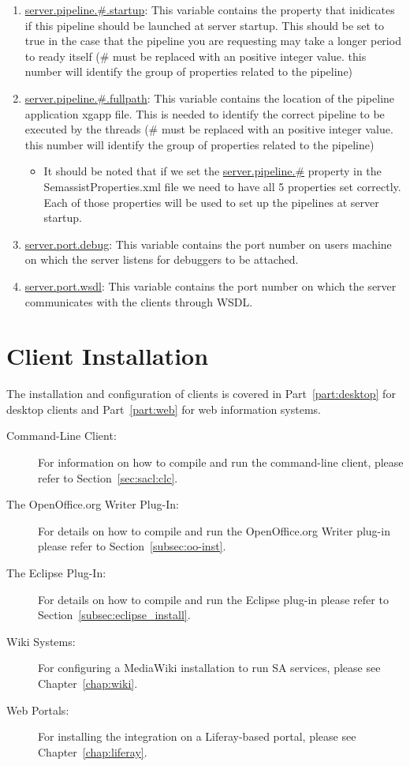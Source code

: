\begin{enumerate}
\item \url{server.pipeline.\#.startup}: This variable contains the property that inidicates if this pipeline should be launched at server startup.  This should be set to true in the case that the pipeline you are requesting may take a longer period to ready itself  (\# must be replaced with an positive integer value.  this number will identify the group of properties related to the pipeline)
\item \url{server.pipeline.\#.fullpath}: This variable contains the location of the pipeline application xgapp file.  This is needed to identify the correct pipeline to be executed by the threads (\# must be replaced with an positive integer value.  this number will identify the group of properties related to the pipeline)
\begin{itemize}
  \item It should be noted that if we set the \url{server.pipeline.\#} property in the SemassistProperties.xml file we need to have all 5 properties set correctly.  Each of those properties will be used to set up the pipelines at server startup.
\end{itemize}
\item \url{server.port.debug}: This variable contains the port number on users machine on which the server listens for debuggers to be attached.
\item \url{server.port.wsdl}: This variable contains the port number on which the server communicates with the clients through WSDL.
\end{enumerate}


\section{Client Installation}
The installation and configuration of clients is covered in
Part~\ref{part:desktop} for desktop clients and Part~\ref{part:web}
for web information systems.

\begin{description}
\item[Command-Line Client:] For information on how to compile and run
  the command-line client, please refer to Section~\ref{sec:sacl:clc}.

\item[The OpenOffice.org Writer Plug-In:] For details on how to
  compile and run the OpenOffice.org Writer plug-in please refer to
  Section~\ref{subsec:oo-inst}.

\item[The Eclipse Plug-In:] For details on how to
  compile and run the Eclipse plug-in please refer to
  Section~\ref{subsec:eclipse_install}.

\item[Wiki Systems:] For configuring a MediaWiki installation to run
  SA services, please see Chapter~\ref{chap:wiki}.

\item[Web Portals:] For installing the \sa integration on a Liferay-based portal, please see Chapter~\ref{chap:liferay}.
\end{description}









